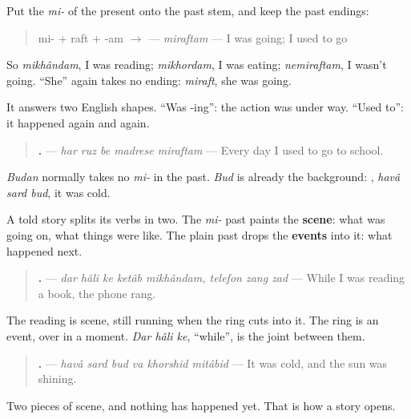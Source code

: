 \begin{grammarlens}[title={Grammar Lens: mi- on the past stem}]
Put the \emph{mi-} of the present onto the past stem, and keep the past endings:

\begin{quote}
mi- + raft + -am $\to$ \textbf{} — \emph{miraftam} — I was going; I used to go
\end{quote}

So \emph{mikhândam}, I was reading; \emph{mikhordam}, I was eating; \emph{nemiraftam}, I wasn't going. \textquotedblleft{}She\textquotedblright{} again takes no ending: \emph{miraft}, she was going.

It answers two English shapes. \textquotedblleft{}Was ‑ing\textquotedblright{}: the action was under way. \textquotedblleft{}Used to\textquotedblright{}: it happened again and again.

\begin{quote}
\textbf{    .} — \emph{har ruz be madrese miraftam} — Every day I used to go to school.
\end{quote}

\emph{Budan} normally takes no \emph{mi-} in the past. \emph{Bud} is already the background: \textbf{  }, \emph{havâ sard bud}, it was cold.
\end{grammarlens}

\begin{grammarlens}[title={Grammar Lens: the scene, and the events}]
A told story splits its verbs in two. The \emph{mi-} past paints the \textbf{scene}: what was going on, what things were like. The plain past drops the \textbf{events} into it: what happened next.

\begin{quote}
\textbf{       .} — \emph{dar hâli ke ketâb mikhândam, telefon zang zad} — While I was reading a book, the phone rang.
\end{quote}

The reading is scene, still running when the ring cuts into it. The ring is an event, over in a moment. \emph{Dar hâli ke}, \textquotedblleft{}while\textquotedblright{}, is the joint between them.

\begin{quote}
\textbf{     .} — \emph{havâ sard bud va khorshid mitâbid} — It was cold, and the sun was shining.
\end{quote}

Two pieces of scene, and nothing has happened yet. That is how a story opens.
\end{grammarlens}

